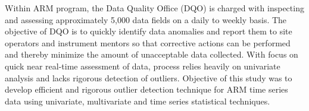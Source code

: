 Within ARM program, the Data Quality Office (DQO) is charged with 
inspecting and assessing approximately 5,000 data fields on a daily 
to weekly basis. The objective of DQO is to quickly identify data 
anomalies and report them to site operators and instrument mentors 
so that corrective actions can be performed and thereby minimize the 
amount of unacceptable data collected. With focus on quick near real-time 
assessment of data, process relies heavily on univariate analysis and lacks 
rigorous detection of outliers. Objective of this study was to develop
efficient and rigorous  outlier detection technique for ARM time series
data using univariate, multivariate and time series statistical
techniques.

